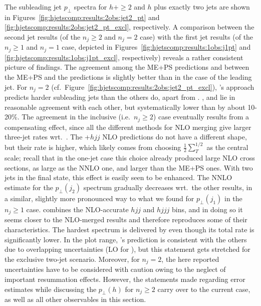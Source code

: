 The subleading jet $p_\perp$ spectra for $h+\ge2$ and $h$ plus exactly
two jets are shown in Figures~\ref{fig:hjetscomp:results:2obs:jet2_pt}
and \ref{fig:hjetscomp:results:2obs:jet2_pt_excl}, respectively. A
comparison between the second jet results (of the
$n_j\ge2$ and $n_j=2$ case) with the first jet results (of the
$n_j\ge1$ and $n_j=1$ case, depicted in
Figures~\ref{fig:hjetscomp:results:1obs:j1pt} and
\ref{fig:hjetscomp:results:1obs:j1pt_excl}, respectively) reveals a
rather consistent picture of findings. The agreement among the ME+PS
predictions and between the ME+PS and the \Powheg predictions is
slightly better than in the case of the leading jet. For $n_j=2$
(cf.~Figure~\ref{fig:hjetscomp:results:2obs:jet2_pt_excl}), \Powheg's
\NNLOPS approach predicts harder subleading jets than the others do,
apart from \Hej. \MGaMC, \Sherpa and \Herwig lie in reasonable
agreement with each other, but systematically lower than \Powheg by
about 10-20\%. The agreement in the inclusive (i.e.~$n_j\ge2$) case
eventually results from a compensating effect, since all the different
methods for NLO merging give larger three-jet rates wrt.~\Powheg. The
\GoSam{}+\Sherpa $hjj$ NLO predictions do not have a different shape,
but their rate is higher, which likely comes from choosing
$\tfrac{1}{2}\sum_T^{1/2}$ as the central scale; recall that in the
one-jet case this choice already produced large NLO cross sections, as
large as the NNLO one, and larger than the ME+PS ones. With two jets
in the final state, this effect is easily seen to be enhanced. The
\Loopsim NNLO estimate for the $p_\perp(j_2)$ spectrum gradually
decreases wrt.~the other \GoSam results, in a similar, slightly more
pronounced way to what we found for $p_\perp(j_1)$ in the $n_j\ge1$
case. 
\Loopsim combines the NLO-accurate $hjj$ and $hjjj$ bins, and in doing
so it seems closer to the NLO-merged results and therefore reproduces
some of their characteristics. The hardest spectrum is
delivered by \Hej even though its total rate is significantly lower. 
In the plot range, \Hej's prediction is consistent with the others due 
to overlapping uncertainties (LO for \Hej), but this statement gets
stretched for the exclusive two-jet scenario. Moreover, for $n_j=2$,
the here reported uncertainties have to be considered with caution
owing to the neglect of important resummation effects. However, the
statements made regarding error estimates while discussing the
$p_\perp(h)$ for $n_j\ge2$ carry over to the current case, as well as
all other observables in this section.

